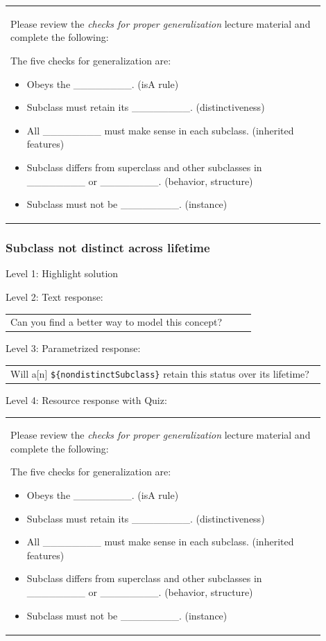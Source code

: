 \begin{tabular}{|p{0.9\linewidth}}
Please review the \textit{checks for proper generalization} lecture material
and complete the following:

The five checks for generalization are:
\begin{itemize}
    \item Obeys the \_\_\_\_\_\_\_\_. (isA rule)
    \item Subclass must retain its \_\_\_\_\_\_\_\_. (distinctiveness)
    \item All \_\_\_\_\_\_\_\_ must make sense in each subclass. (inherited features)
    \item Subclass differs from superclass and other subclasses in \_\_\_\_\_\_\_\_ or \_\_\_\_\_\_\_\_. (behavior, structure)
    \item Subclass must not be \_\_\_\_\_\_\_\_. (instance)
\end{itemize}

\end{tabular} \medskip


\subsubsection{Subclass not distinct across lifetime}

\noindent Level 1: Highlight solution \medskip

\noindent Level 2: Text response: \medskip

\begin{tabular}{|p{0.9\linewidth}}
Can you find a better way to model this concept?
\end{tabular} \medskip

\noindent Level 3: Parametrized response: \medskip

\begin{tabular}{|p{0.9\linewidth}}
Will a[n] \verb|${nondistinctSubclass}| retain this status over its lifetime?
\end{tabular} \medskip

\noindent Level 4: Resource response with Quiz: \medskip

\begin{tabular}{|p{0.9\linewidth}}
Please review the \textit{checks for proper generalization} lecture material
and complete the following:

The five checks for generalization are:
\begin{itemize}
    \item Obeys the \_\_\_\_\_\_\_\_. (isA rule)
    \item Subclass must retain its \_\_\_\_\_\_\_\_. (distinctiveness)
    \item All \_\_\_\_\_\_\_\_ must make sense in each subclass. (inherited features)
    \item Subclass differs from superclass and other subclasses in \_\_\_\_\_\_\_\_ or \_\_\_\_\_\_\_\_. (behavior, structure)
    \item Subclass must not be \_\_\_\_\_\_\_\_. (instance)
\end{itemize}

\end{tabular} \medskip


